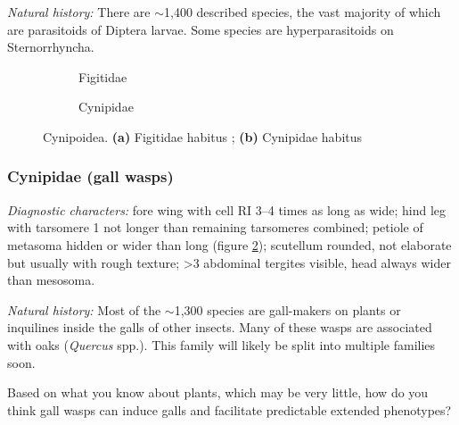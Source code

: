 \noindent{}\textit{Natural history:} There are $\sim$1,400 described species, the vast majority of which are parasitoids of Diptera larvae. Some species are hyperparasitoids on Sternorrhyncha.\vspace{3mm}

\begin{figure}[ht!]
  \centering
\begin{subfigure}[ht!]{0.45\textwidth}
  \caption{Figitidae}
  \label{fig:figid1}
\end{subfigure}
    \hfill
\begin{subfigure}[ht!]{0.4\textwidth}
  \caption{Cynipidae}
  \label{fig:cynipid1}
\end{subfigure}
    \caption{Cynipoidea. \textbf{(a)} Figitidae habitus \citep[][Fig. 195]{goulet1993hymenoptera}; \textbf{(b)} Cynipidae habitus \citep[][Fig. 197]{goulet1993hymenoptera}}\label{fig:cynipoids}
\end{figure}

\subsubsection{Cynipidae (gall wasps)}
\noindent{}\textit{Diagnostic characters:} fore wing with cell RI 3--4 times as long as wide; hind leg with tarsomere 1 not longer than remaining tarsomeres combined; petiole of metasoma hidden or wider than long (figure \ref{fig:cynipid1}); scutellum rounded, not elaborate but usually with rough texture; \textgreater{}3 abdominal tergites visible, head always wider than mesosoma.\vspace{3mm}

\noindent{}\textit{Natural history:} Most of the $\sim$1,300 species are gall-makers on plants or inquilines inside the galls of other insects. Many of these wasps are associated with oaks (\textit{Quercus} spp.). This family will likely be split into multiple families soon.\vspace{3mm}

\begin{theo}
{}Based on what you know about plants, which may be very little, how do you think gall wasps can induce galls and facilitate predictable extended phenotypes?
\end{theo}\vspace{3mm}

